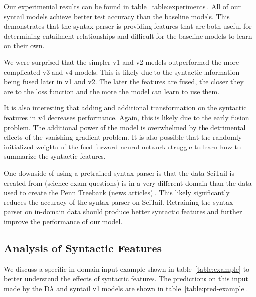 \documentclass[11pt,a4paper]{article}
\begin{document}
Our experimental results can be found in table~\ref{table:experiments}.
All of our syntail models
achieve better test accuracy than the baseline models. This demonstrates
that the syntax parser is providing features that are both useful for
determining entailment relationships and difficult for the baseline
models to learn on their own.

We were surprised that the simpler v1 and v2 models outperformed the
more complicated v3 and v4 models. This is likely due to the syntactic
information being fused later in v1 and v2. The later the features are
fused, the closer they are to the loss function and the more the model
can learn to use them.

It is also interesting that adding and additional transformation
on the syntactic features in v4 decreases performance.
Again, this is likely due to the early fusion problem.
The additional power of the model is overwhelmed by the detrimental
effects of the vanishing gradient problem.
It is also possible that the randomly initialized weights 
of the feed-forward neural network struggle to learn how to
summarize the syntactic features.

One downside of using a pretrained syntax parser is that the data SciTail is
created from (science exam questions) is in a very different domain than
the data used to create the Penn Treebank (news articles)
\citep{marcus1993building}.
This likely significantly reduces the accuracy of the syntax parser on
SciTail. Retraining the syntax parser on in-domain data
should produce better syntactic features
and further improve 
the performance of our model.

\subsection{Analysis of Syntactic Features}

We discuss a specific in-domain input example shown in table~\ref{table:example}
to better understand the effects of syntactic features. The predictions on this
input made by the DA and
syntail v1 models are shown in table~\ref{table:pred-example}.

\begin{table}[t]
    \centering
    \caption{A pair of sentences where syntail performs particularly well. The hypothesis is
             entailed by the premise.}
\label{table:example}
\end{table}
\end{document}
